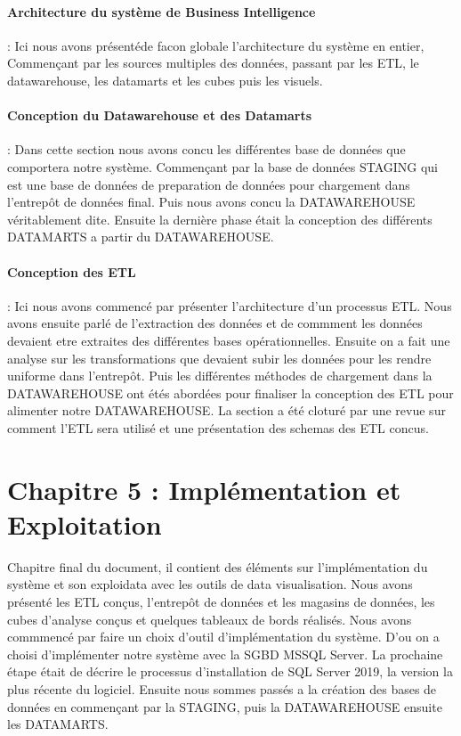 \paragraph{Architecture du système de Business Intelligence} : Ici nous avons présentéde facon globale l'architecture du système en entier, Commençant par les sources multiples des données, passant par les ETL, le datawarehouse, les datamarts et les cubes puis les visuels.

\paragraph{Conception du Datawarehouse et des Datamarts} : Dans cette section nous avons concu les différentes base de données que comportera notre système. Commençant par la base de données STAGING qui est une base de données de preparation de données pour chargement dans l'entrepôt de données final. Puis nous avons concu la DATAWAREHOUSE véritablement dite. Ensuite la dernière phase était la conception des différents DATAMARTS a partir du DATAWAREHOUSE. 

\paragraph{Conception des ETL} : Ici nous avons commencé par présenter l'architecture d'un processus ETL. Nous avons ensuite parlé de l'extraction des données et de commment les données devaient etre extraites des différentes bases opérationnelles. Ensuite on a fait une analyse sur les transformations que devaient subir les données pour les rendre uniforme dans l'entrepôt. Puis les différentes méthodes de chargement dans la DATAWAREHOUSE ont étés abordées pour finaliser la conception des ETL pour alimenter notre DATAWAREHOUSE. La section a été cloturé par une revue sur comment l'ETL sera utilisé et une présentation des schemas des ETL concus. 


\section*{Chapitre 5 : Implémentation et Exploitation}
Chapitre final du document, il contient des éléments sur l'implémentation du système et son exploidata avec les outils de data visualisation. Nous avons présenté les ETL conçus, l’entrepôt de données et les magasins de données, les cubes d’analyse conçus et quelques tableaux de bords réalisés. Nous avons commmencé par faire un choix d'outil d'implémentation du système. D'ou on a choisi d'implémenter notre système avec la SGBD MSSQL Server. La prochaine étape était de décrire le processus d'installation de SQL Server 2019, la version la plus récente du logiciel. Ensuite nous sommes passés a la création des bases de données en commençant par la STAGING, puis la DATAWAREHOUSE ensuite les DATAMARTS. 

